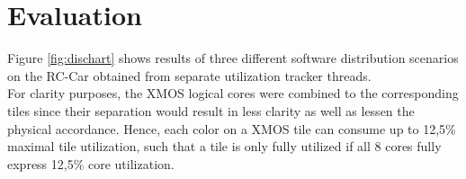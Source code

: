 \documentclass [a4paper,final,conference,10pt]{IDAACS}
\begin{document}


\section{Evaluation}
\label{sec:eval}
Figure \ref{fig:dischart} shows results of three different software distribution scenarios on the RC-Car obtained from separate utilization tracker threads. \\
For clarity purposes, the XMOS logical cores were combined to the corresponding tiles since their separation would result in less clarity as well as lessen the physical accordance. Hence, each color on a XMOS tile can consume up to 12,5\% maximal tile utilization, such that a tile is only fully utilized if all 8 cores fully express 12,5\% core utilization.
\end{document}
